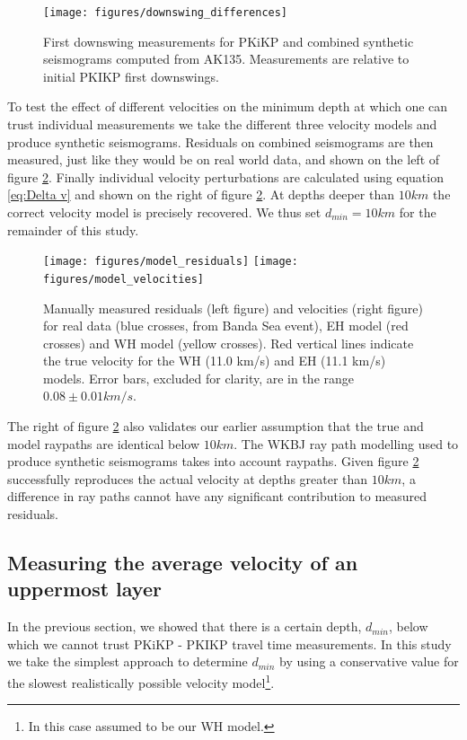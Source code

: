 \documentclass[11pt,a4paper]{article}
\begin{document}
\begin{figure}
	\centering
	\texttt{[image: figures/downswing\_differences]}
	\caption{First downswing measurements for PKiKP and combined synthetic seismograms computed from AK135. Measurements are relative to initial PKIKP first downswings.}
	\label{fig:Downswing differences}
\end{figure}

To test the effect of different velocities on the minimum depth at which one can trust individual measurements we take the different three velocity models and produce synthetic seismograms. Residuals on combined seismograms are then measured, just like they would be on real world data, and shown on the left of figure \ref{fig:Residual models}. Finally individual velocity perturbations are calculated using equation \eqref{eq:Delta v} and shown on the right of figure \ref{fig:Residual models}. At depths deeper than $10km$ the correct velocity model is precisely recovered. We thus set $d_{min} = 10km$ for the remainder of this study.

\begin{figure}
	\centering
	\texttt{[image: figures/model\_residuals]}
	\texttt{[image: figures/model\_velocities]}
	\caption{Manually measured residuals (left figure) and velocities (right figure) for real data (blue crosses, from Banda Sea event), EH model (red crosses) and WH model (yellow crosses). Red vertical lines indicate the true velocity for the WH (11.0 km/s) and EH (11.1 km/s) models. Error bars, excluded for clarity, are in the range $0.08 \pm 0.01 km/s$.}
	\label{fig:Residual models}
\end{figure}

The right of figure \ref{fig:Residual models} also validates our earlier assumption that the true and model raypaths are identical below $10km$. The WKBJ ray path modelling used to produce synthetic seismograms takes into account raypaths. Given figure \ref{fig:Residual models} successfully reproduces the actual velocity at depths greater than $10km$, a difference in ray paths cannot have any significant contribution to measured residuals.

\subsection{Measuring the average velocity of an uppermost layer}
In the previous section, we showed that there is a certain depth, $d_{min}$, below which we cannot trust PKiKP - PKIKP travel time measurements. In this study we take the simplest approach to determine $d_{min}$ by using a conservative value for the slowest realistically possible velocity model\footnote{In this case assumed to be our WH model.}.
\end{document}

